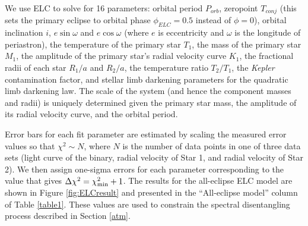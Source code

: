 We use ELC to solve for 16 parameters: orbital period $P_{orb}$, zeropoint $T_{conj}$ (this sets the primary eclipse to orbital phase $\phi_{ELC} = 0.5$ instead of $\phi = 0$), orbital inclination $i$, $e \sin \omega$ and $e \cos \omega$ (where $e$ is eccentricity and $\omega$ is the longitude of periastron), the temperature of the primary star $T_1$, the mass of the primary star $M_1$, the amplitude of the primary star's radial velocity curve $K_1$, the fractional radii of each star $R_1/a$ and $R_2/a$, the temperature ratio $T_2/T_1$, the \emph{Kepler} contamination factor, and stellar limb darkening parameters for the quadratic limb darkening law. The scale of the system (and hence the component masses and radii) is uniquely determined given the primary star mass, the amplitude of its radial velocity curve, and the orbital period.

Error bars for each fit parameter are estimated by scaling the measured error values so that $\chi^2 \sim N$, where $N$ is the number of data points in one of three data sets (light curve of the binary, radial velocity of Star 1, and radial velocity of Star 2). We then assign one-sigma errors for each parameter corresponding to the value that gives $\Delta \chi^2 = \chi^2_{\rm{min}} + 1$. The results for the all-eclipse ELC model are shown in Figure \ref{fig:ELCresult} and presented in the ``All-eclipse model'' column of Table \ref{table1}. These values are used to constrain the spectral disentangling process described in Section \ref{atm}.

  
  
  
  